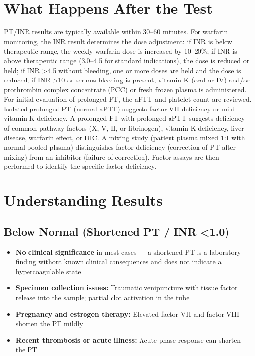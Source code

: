 \section*{What Happens After the Test}
PT/INR results are typically available within 30--60 minutes. For warfarin monitoring, the INR result determines the dose adjustment: if INR is below therapeutic range, the weekly warfarin dose is increased by 10--20\%; if INR is above therapeutic range (3.0--4.5 for standard indications), the dose is reduced or held; if INR >4.5 without bleeding, one or more doses are held and the dose is reduced; if INR >10 or serious bleeding is present, vitamin K (oral or IV) and/or prothrombin complex concentrate (PCC) or fresh frozen plasma is administered. For initial evaluation of prolonged PT, the aPTT and platelet count are reviewed. Isolated prolonged PT (normal aPTT) suggests factor VII deficiency or mild vitamin K deficiency. A prolonged PT with prolonged aPTT suggests deficiency of common pathway factors (X, V, II, or fibrinogen), vitamin K deficiency, liver disease, warfarin effect, or DIC. A mixing study (patient plasma mixed 1:1 with normal pooled plasma) distinguishes factor deficiency (correction of PT after mixing) from an inhibitor (failure of correction). Factor assays are then performed to identify the specific factor deficiency.

\section*{Understanding Results}

\subsection*{Below Normal (Shortened PT / INR <1.0)}
\begin{itemize}
  \item \textbf{No clinical significance} in most cases --- a shortened PT is a laboratory finding without known clinical consequences and does not indicate a hypercoagulable state
  \item \textbf{Specimen collection issues:} Traumatic venipuncture with tissue factor release into the sample; partial clot activation in the tube
  \item \textbf{Pregnancy and estrogen therapy:} Elevated factor VII and factor VIII shorten the PT mildly
  \item \textbf{Recent thrombosis or acute illness:} Acute-phase response can shorten the PT
\end{itemize}

